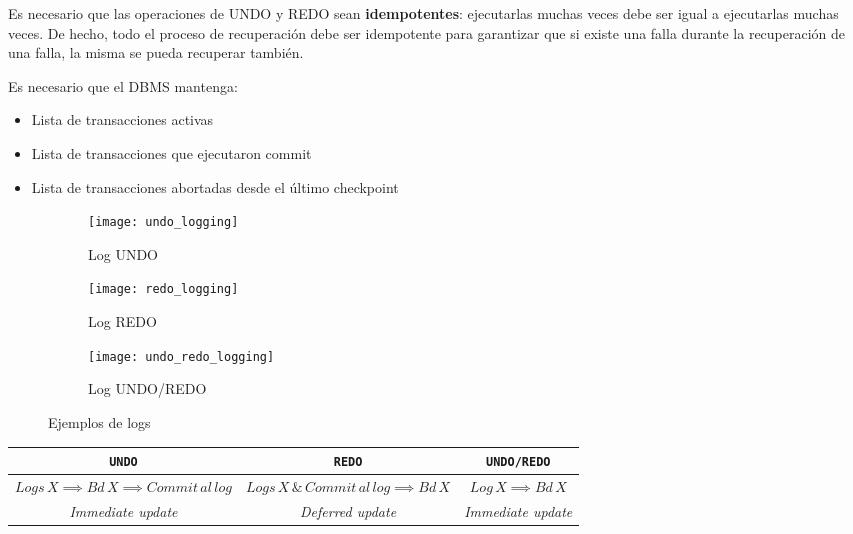 \documentclass[a4paper, twoside]{article}
\begin{document}
Es necesario que las operaciones de UNDO y REDO sean \textbf{idempotentes}: ejecutarlas muchas veces debe ser igual a ejecutarlas muchas veces. De hecho, todo el proceso de recuperación debe ser idempotente para garantizar que si existe una falla durante la recuperación de una falla, la misma se pueda recuperar también.

Es necesario que el DBMS mantenga:
\begin{itemize}
	\item Lista de transacciones activas
	\item Lista de transacciones que ejecutaron commit
	\item Lista de transacciones abortadas desde el último checkpoint
\end{itemize}

\begin{figure}[H]
	\centering
	\begin{subfigure}{0.48\textwidth}
		\texttt{[image: undo\_logging]}
		\caption{Log UNDO}
	\end{subfigure}
	\begin{subfigure}{0.48\textwidth}
		\texttt{[image: redo\_logging]}
		\caption{Log REDO}
	\end{subfigure}
	\begin{subfigure}{0.48\textwidth}
		\texttt{[image: undo\_redo\_logging]}
		\caption{Log UNDO/REDO}
	\end{subfigure}
	\caption{Ejemplos de logs}
\end{figure}

\begin{center}
	\begin{tabular}{|c|c|c|}
		\hline 
		\texttt{\textbf{UNDO}} & \texttt{\textbf{REDO}} & \texttt{\textbf{UNDO/REDO}}\\
		\hline 
		\hline 
		$Logs\, X\implies Bd\, X\implies Commit\, al\, log$ & $Logs\, X\,\&\, Commit\, al\, log\implies Bd\, X$ & $Log\, X\implies Bd\, X$\\
		\hline 
		\emph{Immediate update} & \emph{Deferred update} & \emph{Immediate update}\\
		\hline 
	\end{tabular}
\end{center}


\makeseccioncolaboradores %

\makehistorial
\end{document}
